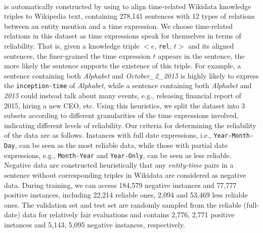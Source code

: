 \paragraph{\TimeRE}
 is automatically constructed by using \DS to align time-related Wikidata\cite{vrandevcic2014wikidata} knowledge triples to
Wikipedia text, containing 278,141 sentences with 12
types of relations  between an entity mention and a time expression.
We choose time-related relations in this dataset as time expressions speak for themselves in
terms of reliability. That is, given a knowledge triple $<$$e$, \texttt{rel}, $t$$>$ and its
aligned sentences,  the  finer-grained the time expression $t$ appears in the sentence,
the more likely the sentence  supports the existence of this triple.
For example, a sentence containing both \emph{Alphabet} and \emph{October\_2\_2015} is highly likely to express the \texttt{inception-time} of \emph{Alphabet}, while a sentence containing both \emph{Alphabet} and \emph{2015} could instead talk  about many events, e.g.,  releasing financial report of 2015, hiring a new CEO, etc.
Using this heuristics, we split the dataset into
3 subsets according to different granularities of the time expressions involved, indicating different levels of reliability.
Our criteria for determining the reliability of the data are as follows.
Instances with full date expressions, i.e., \texttt{Year-Month-Day}, can be seen as the most reliable data, while those with
partial date expressions, e.g., \texttt{Month-Year} and \texttt{Year-Only}, can be seen as less
reliable.  Negative data are constructed  heuristically that any
\emph{entity-time} pairs in a sentence without corresponding triples in Wikidata are considered as negative data.
During training, we can access  184,579 negative
instances and  77,777 positive instances, including 22,214 reliable
ones, 2,094 and 53,469 less reliable ones. The validation set and test set are randomly sampled from
the reliable (full-date) data for relatively fair evaluations and contains
2,776, 2,771 positive instances and 5,143, 5,095 negative instances, respectively.


